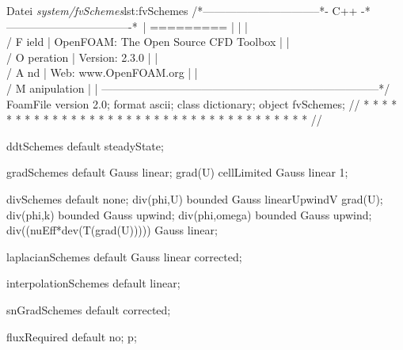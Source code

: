 \begin{dict}{Datei \textit{system/fvSchemes}}{lst:fvSchemes}
/*--------------------------------*- C++ -*----------------------------------*\
| =========                 |                                                 |
| \\      /  F ield         | OpenFOAM: The Open Source CFD Toolbox           |
|  \\    /   O peration     | Version:  2.3.0                                 |
|   \\  /    A nd           | Web:      www.OpenFOAM.org                      |
|    \\/     M anipulation  |                                                 |
\*---------------------------------------------------------------------------*/
FoamFile
{
    version     2.0;
    format      ascii;
    class       dictionary;
    object      fvSchemes;
}
// * * * * * * * * * * * * * * * * * * * * * * * * * * * * * * * * * * * * * //

ddtSchemes
{
    default         steadyState;
}

gradSchemes
{
    default         Gauss linear;
    grad(U)         cellLimited Gauss linear 1;
}

divSchemes
{
    default         none;
    div(phi,U)      bounded Gauss linearUpwindV grad(U);
    div(phi,k)      bounded Gauss upwind;
    div(phi,omega)  bounded Gauss upwind;
    div((nuEff*dev(T(grad(U))))) Gauss linear;
}

laplacianSchemes
{
    default         Gauss linear corrected;
}

interpolationSchemes
{
    default         linear;
}

snGradSchemes
{
    default         corrected;
}

fluxRequired
{
    default         no;
    p;
}
\end{dict}

\newpage

